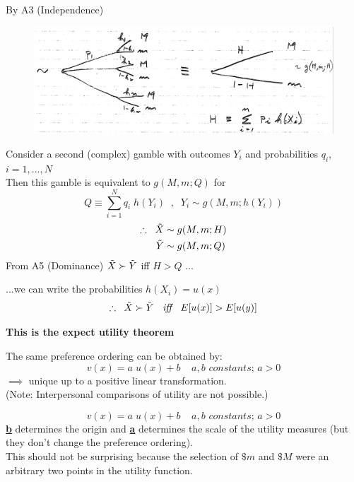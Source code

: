\documentclass[
14pt,notheorems,hyperref={pdfauthor=whatever}
]{beamer}
\begin{document}
\begin{frame}
By A3 (Independence)\\
\begin{figure}[equivalence]
    \includegraphics[width=1\textwidth]{L2-equivalence}
    \centering
\end{figure}
\end{frame}

\begin{frame}
Consider a second (complex) gamble with outcomes $Y_i$ and probabilities $q_i$, $i=1,...,N$\\
Then this gamble is equivalent to $g(M,m;Q)$
for
\[Q \equiv \sum_{i=1}^N q_i\;h(Y_i)\;\;,\;\;Y_i\sim g(M,m;h(Y_i))\]
\begin{align*}
    \therefore \;\; \Tilde{X}&\sim g(M,m;H)\\
    \Tilde{Y}&\sim g(M,m;Q)\\
\end{align*}
From A5 (Dominance) $\Tilde{X} \succ \Tilde{Y}$ iff $H > Q$ ...
\end{frame}

\begin{frame}
...we can write the probabilities $h(X_i) = u(x)$\\
\[\therefore \;\; \Tilde{X}\succ\Tilde{Y}\;\; \textit{ iff }\;\; E[u(x)]>E[u(y)]\]
\begin{center}
    \textbf{This is the expect utility theorem}\\
\end{center}
\hfill \break
The same preference ordering can be obtained by:\\
\[v(x)=a\;u(x)+b \;\;\;\; a,b \textit{ constants; } a>0\]
$\implies$ unique up to a positive linear transformation.\\
(Note: Interpersonal comparisons of utility are not possible.)
\end{frame}

\begin{frame}
\[v(x)=a\;u(x)+b \;\;\;\; a,b \textit{ constants; } a>0\]
\hfill \break
\underline{\textbf{b}} determines the origin and \underline{\textbf{a}} determines the scale of the utility measures (but they don't change the preference ordering).\\
\hfill \break
This should not be surprising because the selection of $\$m$ and $\$M$ were an arbitrary two points in the utility function.
\end{frame}
\end{document}
